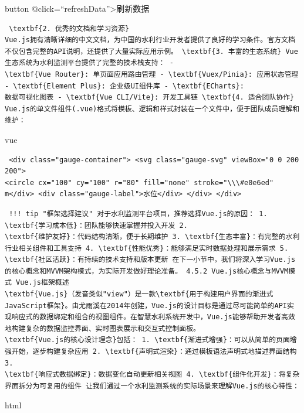 button @click=``refreshData''\textgreater 刷新数据 \begin{lstlisting} \textbf{2. 优秀的文档和学习资源}
Vue.js拥有清晰详细的中文文档，为中国的水利行业开发者提供了良好的学习条件。官方文档不仅包含完整的API说明，还提供了大量实际应用示例。 \textbf{3. 丰富的生态系统} Vue生态系统为水利监测平台提供了完整的技术栈支持： -
\textbf{Vue Router}: 单页面应用路由管理 - \textbf{Vuex/Pinia}: 应用状态管理 - \textbf{Element Plus}: 企业级UI组件库 - \textbf{ECharts}:
数据可视化图表 - \textbf{Vue CLI/Vite}: 开发工具链 \textbf{4. 适合团队协作} Vue.js的单文件组件(.vue)格式将模板、逻辑和样式封装在一个文件中，便于团队成员理解和维护：
\end{lstlisting} vue \begin{verbatim} <div class="gauge-container"> <svg class="gauge-svg" viewBox="0 0 200 200">
<circle cx="100" cy="100" r="80" fill="none" stroke="\\\#e0e6ed" m</div> <div class="gauge-label">水位</div> </div> </div>
\end{verbatim} \begin{lstlisting} !!! tip "框架选择建议" 对于水利监测平台项目，推荐选择Vue.js的原因： 1. \textbf{学习成本低}：团队能够快速掌握并投入开发 2.
\textbf{维护友好}：代码结构清晰，便于长期维护 3. \textbf{生态丰富}：有完整的水利行业相关组件和工具支持 4. \textbf{性能优秀}：能够满足实时数据处理和展示需求 5.
\textbf{社区活跃}：有持续的技术支持和版本更新 在下一小节中，我们将深入学习Vue.js的核心概念和MVVM架构模式，为实际开发做好理论准备。 4.5.2 Vue.js核心概念与MVVM模式 Vue.js框架概述
\textbf{Vue.js}（发音类似"view"）是一款\textbf{用于构建用户界面的渐进式JavaScript框架}。由尤雨溪在2014年创建，Vue.js的设计目标是通过尽可能简单的API实现响应式的数据绑定和组合的视图组件。在智慧水利系统开发中，Vue.js能够帮助开发者高效地构建复杂的数据监控界面、实时图表展示和交互式控制面板。
\textbf{Vue.js的核心设计理念}包括： 1. \textbf{渐进式增强}：可以从简单的页面增强开始，逐步构建复杂应用 2. \textbf{声明式渲染}：通过模板语法声明式地描述界面结构 3.
\textbf{响应式数据绑定}：数据变化自动更新相关视图 4. \textbf{组件化开发}：将复杂界面拆分为可复用的组件 让我们通过一个水利监测系统的实际场景来理解Vue.js的核心特性： \end{lstlisting} html
